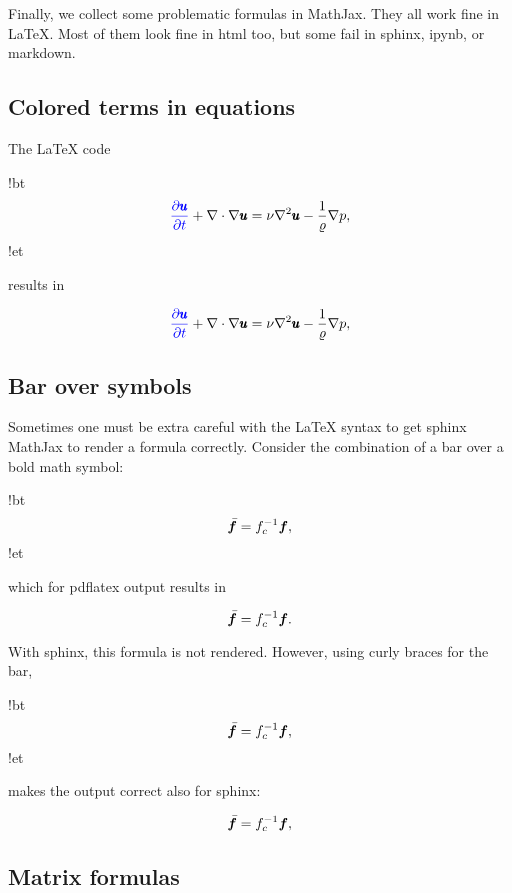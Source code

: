\documentclass[%
oneside,                 %
final,                   %
10pt]{article}
\begin{document}
Finally, we collect some problematic formulas in MathJax. They all work
fine in {\LaTeX}. Most of them look fine in html too, but some fail in
sphinx, ipynb, or markdown.

\subsection{Colored terms in equations}

The {\LaTeX} code







\blatexcod
!bt
\[ {\color{blue}\frac{\partial\pmb{u}}{\partial t}} +
\nabla\cdot\nabla\pmb{u} = \nu\nabla^2\pmb{u} -
\frac{1}{\varrho}\nabla p,\]
!et

\elatexcod


results in

\[ {\color{blue}\frac{\partial\pmb{u}}{\partial t}} +
\nabla\cdot\nabla\pmb{u} = \nu\nabla^2\pmb{u} -
\frac{1}{\varrho}\nabla p,\]

\subsection{Bar over symbols}

Sometimes one must be extra careful with the {\LaTeX} syntax to get sphinx MathJax
to render a formula correctly. Consider the combination of a bar over a
bold math symbol:





\blatexcod
!bt
\[ \bar{\bm{f}} = f_c^{-1}\bm{f},\]
!et

\elatexcod


which for pdflatex output results in

\[ \bar{\bm{f}} = f_c^{-1}\bm{f}.\]

With sphinx, this formula is not rendered. However, using curly braces for the bar,





\blatexcod
!bt
\[ \bar{\bm{f}} = f_c^{-1}\bm{f},\]
!et

\elatexcod


makes the output correct also for sphinx:

\[ \bar{\bm{f}} = f_c^{-1}\bm{f},\]

\subsection{Matrix formulas}
\end{document}
